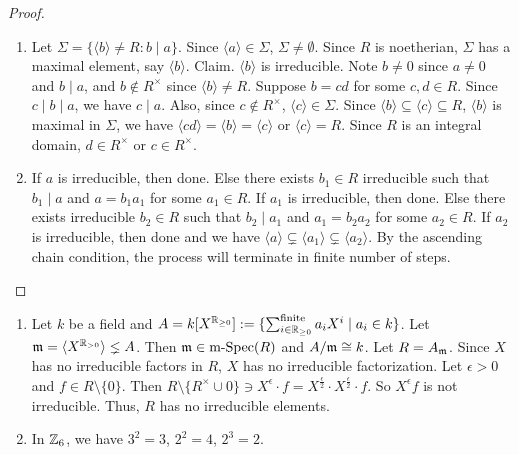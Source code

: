 \begin{proof}
    \begin{enumerate}
        \item Let $\Sigma = \{\langle b \rangle \neq R : b \mid a\}$. Since $\langle a \rangle \in \Sigma$, $\Sigma \neq \emptyset$. Since $R$ is noetherian, $\Sigma$ has a maximal element, say $\langle b \rangle$. Claim. $\langle b \rangle$ is irreducible. Note $b \neq 0$ since $a \neq 0$ and $b \mid a$, and $b \not \in R^{\times}$ since $\langle b \rangle \neq R$. Suppose $b = cd$ for some $c,d \in R$. Since $c \mid b \mid a$, we have $c \mid a$. Also, since $c \not \in R^{\times}$, $\langle c \rangle \in \Sigma$. Since $\langle b \rangle \subseteq \langle c \rangle \subseteq R$, $\langle b \rangle$ is maximal in $\Sigma$, we have $\langle cd \rangle = \langle b \rangle = \langle c \rangle$ or $\langle c \rangle = R$. Since $R$ is an integral domain, $d \in R^{\times}$ or $c \in R^{\times}$.
        \item If $a$ is irreducible, then done. Else there exists $b_1 \in R$ irreducible such that $b_1 \mid a$ and $a = b_1a_1$ for some $a_1 \in R$. If $a_1$ is irreducible, then done. Else there exists irreducible $b_2 \in R$ such that $b_2 \mid a_1$ and $a_1 = b_2a_2$ for some $a_2 \in R$. If $a_2$ is irreducible, then done and we have $\langle a \rangle \subsetneq \langle a_1 \rangle \subsetneq \langle a_2 \rangle$. By the ascending chain condition, the process will terminate in finite number of steps. \qedhere
    \end{enumerate}
\end{proof}

\begin{example}
    \begin{enumerate}
        \item 
            Let $k$ be a field and $A = k[X^{\mathbb{R}_{\geq 0}}] := \{\sum_{i \in \mathbb{R}_{\geq 0}}^{\text{finite}}a_iX^{i} \mid a_i \in k\}$. Let $\mathfrak{m} = \langle X^{\mathbb{R}_{>0}} \rangle \lneq A$. Then $\mathfrak{m} \in \operatorname{m-Spec}(R)$ and $A/\mathfrak{m} \cong k$. Let $R = A_{\mathfrak{m}}$. Since $X$ has no irreducible factors in $R$, $X$ has no irreducible factorization. Let $\epsilon > 0$ and $f \in R \setminus \{0\}$. Then $R \setminus \{R^{\times} \cup 0\} \ni X^{\epsilon} \cdot f = X^{\frac{\epsilon}{2}} \cdot X^{\frac{\epsilon}{2}} \cdot f$. So $X^{\epsilon}f$ is not irreducible. Thus, $R$ has no irreducible elements.
        \item 
            In $\mathbb{Z}_6$, we have $3^{2} = 3$, $2^{2} = 4$, $2^{3} = 2$.
    \end{enumerate}
\end{example}

